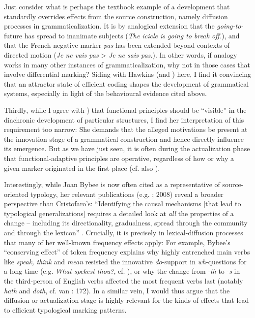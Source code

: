 \documentclass[output=paper]{langsci/langscibook}
\begin{document}
Just consider what is perhaps the textbook example of a development that standardly overrides effects from the source construction, namely diffusion processes in grammaticalization. It is by analogical extension that the \textit{going-to-}future has spread to inanimate subjects (\textit{The icicle is going to break off.}), and that the French negative marker \textit{pas} has been extended beyond contexts of directed motion (\textit{Je ne vais pas} > \textit{Je ne sais pas.}). In other words, if analogy works in many other instances of grammaticalization, why not in those cases that involve differential marking? Siding with Hawkins (and \citealt{Haspelmath2019 [this volume]}) here, I find it convincing that an attractor state of efficient coding shapes the development of grammatical systems, especially in light of the behavioural evidence cited above.

Thirdly, while I agree with \citet{Cristofaro2019 [this volume]}) that functional principles should be “visible” in the diachronic development of particular structures, I find her interpretation of this requirement too narrow: She demands that the alleged motivations be present at the innovation stage of a grammatical construction and hence directly influence its emergence. But as we have just seen, it is often during the actualization phase that functional-adaptive principles are operative, regardless of how or why a given marker originated in the first place (cf. also \citealt{Seržant2019 [this volume]}). 

Interestingly, while Joan Bybee is now often cited as a representative of source-oriented typology, her relevant publications (e.g. \citealt{Bybee1988}; 2008) reveal a broader perspective than Cristofaro’s: “Identifying the causal mechanisms [that lead to typological generalizations] requires a detailed look at \textit{all} the properties of a change – including its directionality, gradualness, spread through the community and through the lexicon” \citep[108]{Bybee2008}. Crucially, it is precisely in lexical-diffusion processes that many of her well-known frequency effects apply: For example, Bybee’s “conserving effect” of token frequency explains why highly entrenched main verbs like \textit{speak, think} and \textit{mean} resisted the innovative \textit{do}{}-support in \textit{wh}{}-questions for a long time (e.g. \textit{What spekest thou?}, cf. \citealt{Ogura1993}), or why the change from -\textit{th} to -\textit{s} in the third-person of English verbs affected the most frequent verbs last (notably \textit{hath} and \textit{doth}, cf. van \citealt{Gelderen2014}: 172). In a similar vein, I would thus argue that the diffusion or actualization stage is highly relevant for the kinds of effects that lead to efficient typological marking patterns. 
\end{document}
